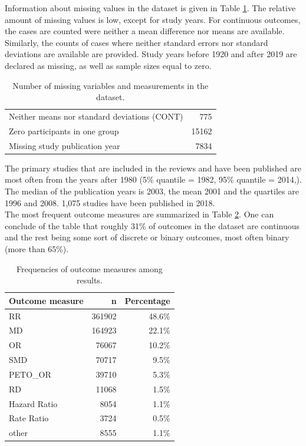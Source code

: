 \documentclass[11pt,a4paper,twoside]{book}\usepackage[]{graphicx}\usepackage[]{color}
\begin{document}
Information about missing values in the dataset is given in Table \ref{missing}. The relative amount of missing values is low, except for study years. For continuous outcomes, the cases are counted were neither a mean difference nor means are available. Similarly, the counts of cases where neither standard errors nor standard deviations are available are provided. Study years before 1920 and after 2019 are declared as missing, as well as sample sizes equal to zero.

\begin{table}[ht]
\centering
\begingroup\footnotesize
\begin{tabular}{lr}
  \hline
  \hline
Neither means nor standard deviations (CONT) & 775 \\ 
  Zero participants in one group & 15162 \\ 
  Missing study publication year & 7834 \\ 
   \hline
\end{tabular}
\endgroup
\caption{Number of missing variables and measurements in the dataset.} 
\label{missing}
\end{table}


The primary studies that are included in the reviews and have been published are most often from the years after 1980 (5\% quantile = 1982, 95\% quantile = 2014,). The median of the publication years is 2003, the mean 2001 and the quartiles are 1996 and 2008. 1,075 studies have been published in 2018.\\
The most frequent outcome measures are summarized in Table \ref{outcome.measure.frequencies}. One can conclude of the table that roughly 31\% of outcomes in the dataset are continuous and the rest being some sort of discrete or binary outcomes, most often binary (more than 65\%).

\begin{table}[ht]
\centering
\begingroup\footnotesize
\begin{tabular}{lrr}
  \hline
Outcome measure & n & Percentage \\ 
  \hline
RR & 361902 & 48.6\% \\ 
  MD & 164923 & 22.1\% \\ 
  OR & 76067 & 10.2\% \\ 
  SMD & 70717 & 9.5\% \\ 
  PETO\_OR & 39710 & 5.3\% \\ 
  RD & 11068 & 1.5\% \\ 
  Hazard Ratio & 8054 & 1.1\% \\ 
  Rate Ratio & 3724 & 0.5\% \\ 
  other & 8555 & 1.1\% \\ 
   \hline
\end{tabular}
\endgroup
\caption{Frequencies of outcome measures among results.} 
\label{outcome.measure.frequencies}
\end{table}
\end{document}
